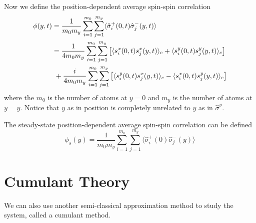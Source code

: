 \documentclass{article}
\begin{document}
\begin{enumerate}
    Now we define the position-dependent average spin-spin correlation
    \begin{align}
        \phi(y,t) &= \frac{1}{m_{0}m_{y}}\sum_{i=1}^{m_0}\sum_{j=1}^{m_y}\langle \hat{\sigma}_i^+(0,t)\hat{\sigma}_j^-(y,t)\rangle\\
        \notag          &=\frac{1}{4m_{0}m_{y}}\sum_{i=1}^{m_0}\sum_{j=1}^{m_y}\left[\langle s_i^x(0,t) s_j^x(y,t)\rangle_e+\langle s_i^y(0,t) s_j^y(y,t)\rangle_e \right]\\
        \notag          &\ +\frac{i}{4m_{0}m_{y}}\sum_{i=1}^{m_0}\sum_{j=1}^{m_y}\left[\langle s_i^y(0,t)s_j^x(y,t)\rangle_e-\langle s_i^x(0,t)s_j^y(y,t)\rangle_e \right]
    \end{align}
    where the $m_0$ is the number of atoms at $y=0$ and $m_y$ is the number of atoms at $y=y$. Notice that $y$ as in position is completely unrelated to $y$ as in $\hat{\sigma}^y$.
    
    The steady-state position-dependent average spin-spin correlation can be defined
    \begin{equation}
        \phi_s(y) = \frac{1}{m_{0}m_{y}}\sum_{i=1}^{m_0}\sum_{j=1}^{m_y}\langle \hat{\sigma}_i^+(0)\hat{\sigma}_j^-(y)\rangle
    \end{equation}
\end{enumerate}





\section{Cumulant Theory}
\label{section: cumulant}

We can also use another semi-classical approximation method to study the system, called a cumulant method.

\printbibliography
\end{document}

